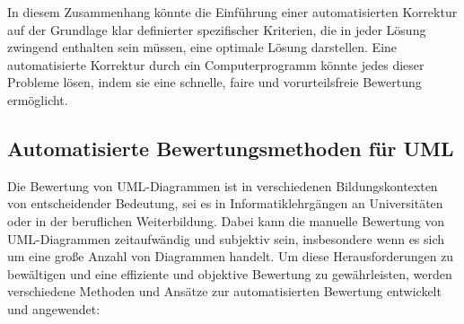 In diesem Zusammenhang könnte die Einführung einer automatisierten Korrektur auf der Grundlage klar definierter spezifischer Kriterien, die in jeder Lösung zwingend enthalten sein müssen, eine optimale Lösung darstellen. Eine automatisierte Korrektur durch ein Computerprogramm könnte jedes dieser Probleme lösen, indem sie eine schnelle, faire und vorurteilsfreie Bewertung ermöglicht.

\subsection{Automatisierte Bewertungsmethoden für UML}

Die Bewertung von UML-Diagrammen ist in verschiedenen Bildungskontexten von entscheidender Bedeutung, sei es in Informatiklehrgängen an Universitäten oder in der beruflichen Weiterbildung. Dabei kann die manuelle Bewertung von UML-Diagrammen zeitaufwändig und subjektiv sein, insbesondere wenn es sich um eine große Anzahl von Diagrammen handelt. Um diese Herausforderungen zu bewältigen und eine effiziente und objektive Bewertung zu gewährleisten, werden verschiedene Methoden und Ansätze zur automatisierten Bewertung entwickelt und angewendet:

